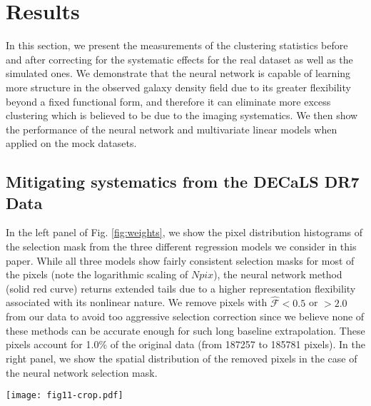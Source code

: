 \documentclass[fleqn, usenatbib]{mnras}
\begin{document}
\section{Results}\label{sec:results}
In this section, we present the measurements of the clustering statistics before and after correcting for the systematic effects for the real dataset as well as the simulated ones. We demonstrate that the neural network is capable of learning more structure in the observed galaxy density field due to its greater flexibility beyond a fixed functional form, and therefore it can eliminate more excess clustering which is believed to be due to the imaging systematics. We then show the performance of the neural network and multivariate linear models when applied on the mock datasets.

\subsection{Mitigating systematics from the DECaLS DR7 Data}
\label{sec:mitigateDR7}
In the left panel of Fig. \ref{fig:weights}, we show the pixel distribution histograms of the selection mask from the three different regression models we consider in this paper. While all three models show fairly consistent selection masks for most of the pixels (note the logarithmic scaling of $Npix$), the neural network method (solid red curve) returns extended tails due to a higher representation flexibility associated with its nonlinear nature. We remove pixels with $\hat{\mathcal{F}} < 0.5$ or $> 2.0$ from our data to avoid too aggressive selection correction since we believe none of these methods can be accurate enough for such long baseline extrapolation. These pixels account for 1.0\% of the original data (from 187257 to 185781 pixels). In the right panel, we show the spatial distribution of the removed pixels in the case of the neural network selection mask. \\

\begin{figure*}
    \centering
    \texttt{[image: fig11-crop.pdf]}
    \caption{\textit{Left}: Distribution of the selection masks (i.e., estimates of the contamination model) derived from different regression models. \textit{Right}: Spatial scatter of the pixels we remove from our data due to the extreme values of the neural network selection mask.}
    \label{fig:weights}
\end{figure*}
\end{document}
